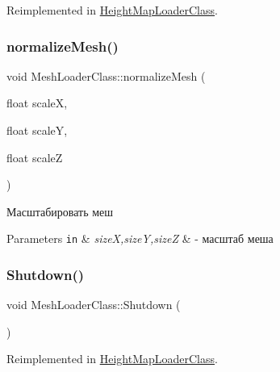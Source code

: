 Reimplemented in \hyperlink{class_height_map_loader_class_a9b6d6734cb3121838708ca16e24a8d3c}{Height\+Map\+Loader\+Class}.

\mbox{\label{class_mesh_loader_class_ae242b7c70bceaea17fc42dfab9e1c9b6}} 
\subsubsection{\texorpdfstring{normalize\+Mesh()}{normalizeMesh()}}
{\footnotesize\ttfamily void Mesh\+Loader\+Class\+::normalize\+Mesh (\begin{DoxyParamCaption}\item[{float}]{scaleX,  }\item[{float}]{scaleY,  }\item[{float}]{scaleZ }\end{DoxyParamCaption})\hspace{0.3cm}{\ttfamily [private]}}



Масштабировать меш 


\begin{DoxyParams}[1]{Parameters}
\mbox{\tt in}  & {\em sizeX,sizeY,sizeZ} & -\/ масштаб меша \\
\hline
\end{DoxyParams}
\mbox{\label{class_mesh_loader_class_a7d91e4ba3144e686c1215ad161d5a6b0}} 
\subsubsection{\texorpdfstring{Shutdown()}{Shutdown()}}
{\footnotesize\ttfamily void Mesh\+Loader\+Class\+::\+Shutdown (\begin{DoxyParamCaption}{ }\end{DoxyParamCaption})\hspace{0.3cm}{\ttfamily [virtual]}}



Reimplemented in \hyperlink{class_height_map_loader_class_a7d0685c6784bb9c525085a87fcecae0b}{Height\+Map\+Loader\+Class}.



